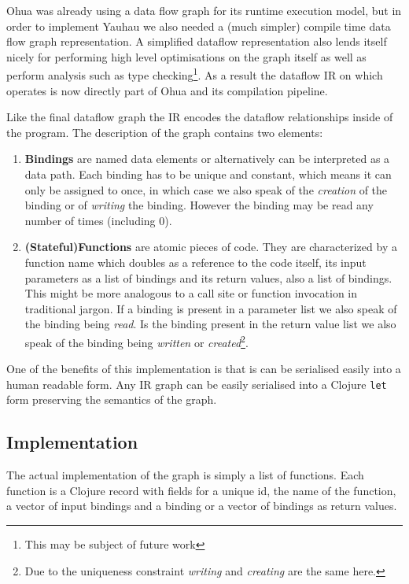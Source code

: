 Ohua was already using a data flow graph for its runtime execution model, but in order to implement Yauhau we also needed a (much simpler) compile time data flow graph representation.
A simplified dataflow representation also lends itself nicely for performing high level optimisations on the graph itself as well as perform analysis such as type checking\footnote{This may be subject of future work}.
As a result the dataflow IR on which \yauhau{} operates is now directly part of Ohua and its compilation pipeline.

Like the final dataflow graph the IR encodes the dataflow relationships inside of the program.
The description of the graph contains two elements:

\begin{enumerate}
    \item \textbf{Bindings} are named data elements or alternatively can be interpreted as a data path.
    Each binding has to be unique and constant, which means it can only be assigned to once, in which case we also speak of the \textit{creation} of the binding or of \textit{writing} the binding.
    However the binding may be read any number of times (including 0).
    \item \textbf{(Stateful)Functions} are atomic pieces of code.
    They are characterized by a function name which doubles as a reference to the code itself, its input parameters as a list of bindings and its return values, also a list of bindings.
    This might be more analogous to a call site or function invocation in traditional jargon.
    If a binding is present in a parameter list we also speak of the binding being \textit{read}.
    Is the binding present in the return value list we also speak of the binding being \textit{written} or \textit{created}\footnote{Due to the uniqueness constraint \textit{writing} and \textit{creating} are the same here.}.
\end{enumerate}

One of the benefits of this implementation is that is can be serialised easily into a human readable form.
Any IR graph can be easily serialised into a Clojure \texttt{let} form preserving the semantics of the graph.

\subsection{Implementation}

The actual implementation of the graph is simply a list of functions. Each function is a Clojure record with fields for a unique id, the name of the function, a vector of input bindings and a binding or a vector of bindings as return values.

